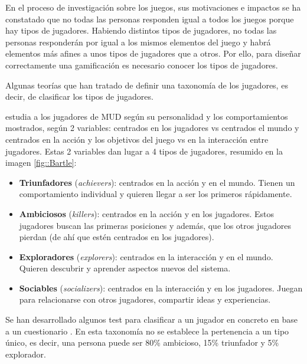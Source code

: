 %
En el proceso de investigación sobre los juegos, sus motivaciones e impactos se ha constatado que no todas las personas responden igual a todos los juegos porque hay tipos de jugadores. 
%
Habiendo distintos tipos de jugadores, no todas las personas responderán por igual a los mismos elementos del juego y habrá elementos más afines a unos tipos de jugadores que a otros. 
%
Por ello, para diseñar correctamente una gamificación es necesario conocer los tipos de jugadores.

Algunas teorías que han tratado de definir una taxonomía de los jugadores, es decir, de clasificar los tipos de jugadores.

 \cite{TypeMUD} estudia a los jugadores de \gls{MUD} según su personalidad y los comportamientos mostrados, según 2 variables: centrados en los jugadores vs centrados el mundo y centrados en la acción y los objetivos del juego vs en la interacción entre jugadores.
%
Estas 2 variables dan lugar a 4 tipos de jugadores, resumido en la imagen \ref{fig::Bartle}:
\begin{itemize}
	\item  \textbf{Triunfadores} (\textit{achievers}): centrados en la acción y en el mundo.
	Tienen un comportamiento individual y quieren llegar a ser los primeros rápidamente.
	

	\item \textbf{Ambiciosos} (\textit{killers}): centrados en la acción y en los jugadores. 
	Estos jugadores buscan las primeras posiciones y además, que los otros jugadores pierdan (de ahí que estén centrados en los jugadores).
	

	\item \textbf{Exploradores} (\textit{explorers}): centrados en la interacción y en el mundo.
	Quieren descubrir y aprender aspectos nuevos del sistema.

	\item \textbf{Sociables} (\textit{socializers}): centrados en la interacción y en los jugadores.
	Juegan para relacionarse con otros jugadores, compartir ideas y experiencias.
\end{itemize}

Se han desarrollado algunos test para clasificar a un jugador en concreto en base a un cuestionario  \cite{Bartletest}.
%
En esta taxonomía no se establece la pertenencia a un tipo único, es decir, una persona puede ser 80\% ambicioso, 15\% triunfador y 5\% explorador.


